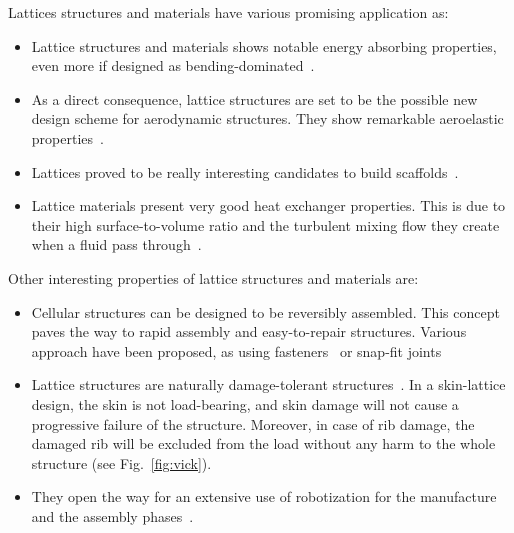 Lattices structures and materials have various promising application as:
\begin{itemize}
    \item Lattice structures and materials shows notable energy absorbing properties, even more if designed as bending-dominated~.
    \item As a direct consequence, lattice structures are set to be the possible new design scheme for aerodynamic structures. They show remarkable aeroelastic properties~.
    \item Lattices proved to be really interesting candidates to build scaffolds~.
    \item Lattice materials present very good heat exchanger properties. This is due to their high surface-to-volume ratio and the turbulent mixing flow they create when a fluid pass through~.
\end{itemize}

Other interesting properties of lattice structures and materials are:
\begin{itemize}
    \item Cellular structures can be designed to be reversibly assembled. This concept paves the way to rapid assembly and easy-to-repair structures. Various approach have been proposed, as using fasteners~ or snap-fit joints~
    \item     
    
    Lattice structures are naturally damage-tolerant structures~. In a skin-lattice design, the skin is not load-bearing, and skin damage will not cause a progressive failure of the structure. Moreover, in case of rib damage, the damaged rib will be excluded from the load without any harm to the whole structure (see Fig.~\ref{fig:vick}).
    \item They open the way for an extensive use of robotization for the manufacture~ and the assembly phases~.
\end{itemize}

